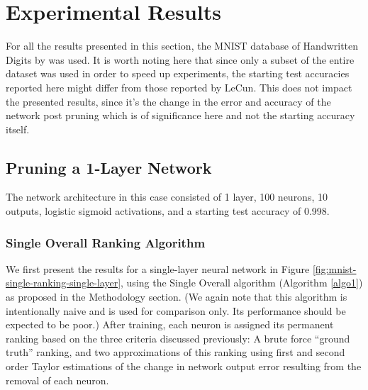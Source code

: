 \section{Experimental Results}
For all the results presented in this section, the MNIST database of Handwritten Digits by \cite{lecun-mnisthandwrittendigit-2010} was used. It is worth noting here that since only a subset of the entire dataset was used in order to speed up experiments, the starting test accuracies reported here might differ from those reported by LeCun. This does not impact the presented results, since it's the change in the error and accuracy of the network post pruning which is of significance here and not the starting accuracy itself.

\subsection{Pruning a 1-Layer Network}
The network architecture in this case consisted of 1 layer, 100 neurons, 10 outputs, logistic sigmoid activations, and a starting test accuracy of 0.998.
\subsubsection{Single Overall Ranking Algorithm}
We first present the results for a single-layer neural network in Figure \ref{fig:mnist-single-ranking-single-layer}, using the Single Overall algorithm (Algorithm \ref{algo1}) as proposed in the Methodology section. (We again note that this algorithm is intentionally naive and is used for comparison only. Its performance should be expected to be poor.) After training, each neuron is assigned its permanent ranking based on the three criteria discussed previously: A brute force ``ground truth'' ranking, and two approximations of this ranking using first and second order Taylor estimations of the change in network output error resulting from the removal of each neuron. 

